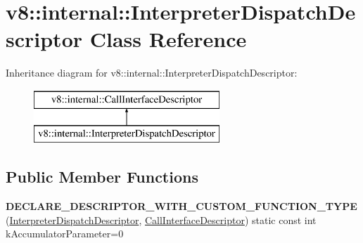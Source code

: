 \hypertarget{classv8_1_1internal_1_1_interpreter_dispatch_descriptor}{}\section{v8\+:\+:internal\+:\+:Interpreter\+Dispatch\+Descriptor Class Reference}
\label{classv8_1_1internal_1_1_interpreter_dispatch_descriptor}
Inheritance diagram for v8\+:\+:internal\+:\+:Interpreter\+Dispatch\+Descriptor\+:\begin{figure}[H]
\begin{center}
\leavevmode
\includegraphics[height=2.000000cm]{classv8_1_1internal_1_1_interpreter_dispatch_descriptor}
\end{center}
\end{figure}
\subsection*{Public Member Functions}
\begin{DoxyCompactItemize}
\item 
{\bfseries D\+E\+C\+L\+A\+R\+E\+\_\+\+D\+E\+S\+C\+R\+I\+P\+T\+O\+R\+\_\+\+W\+I\+T\+H\+\_\+\+C\+U\+S\+T\+O\+M\+\_\+\+F\+U\+N\+C\+T\+I\+O\+N\+\_\+\+T\+Y\+PE} (\hyperlink{classv8_1_1internal_1_1_interpreter_dispatch_descriptor}{Interpreter\+Dispatch\+Descriptor}, \hyperlink{classv8_1_1internal_1_1_call_interface_descriptor}{Call\+Interface\+Descriptor}) static const int k\+Accumulator\+Parameter=0\hypertarget{classv8_1_1internal_1_1_interpreter_dispatch_descriptor_aa6ddde94ddc494c3bb328b37a255ad9a}{}\label{classv8_1_1internal_1_1_interpreter_dispatch_descriptor_aa6ddde94ddc494c3bb328b37a255ad9a}

\end{DoxyCompactItemize}

